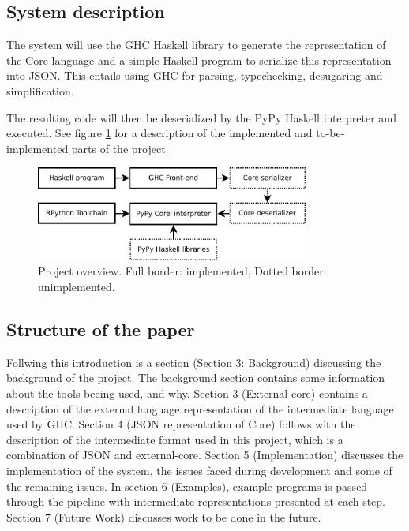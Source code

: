 \subsection{System description}

The system will use the GHC Haskell library to generate the 
representation of the Core language and a simple Haskell program to 
serialize this representation into JSON. This entails using GHC for
parsing, typechecking, desugaring and simplification.

The resulting code will then be deserialized by the PyPy Haskell interpreter 
and executed. See figure \ref{overview} for a description of the implemented and
to-be-implemented parts of the project.

\begin{figure}[H]
\centering
\includegraphics[width=0.8\textwidth]{diags/overview}
\caption{Project overview. Full border: implemented, Dotted border: unimplemented.}
\label{overview}
\end{figure}

\subsection{Structure of the paper}

Follwing this introduction is a section (Section 3: Background) discussing the 
background of the project. The background section contains some information about 
the tools beeing used, and why.
Section 3 (External-core) contains a description of the external language representation
of the intermediate language used by GHC.
Section 4 (JSON representation of Core) follows with the description of the intermediate format
used in this project, which is a combination of JSON and external-core.
Section 5 (Implementation) discusses the implementation of the system, the issues faced
during development and some of the remaining issues.
In section 6 (Examples), example programs is passed through the pipeline with intermediate
representations presented at each step.
Section 7 (Future Work) discusses work to be done in the future.


